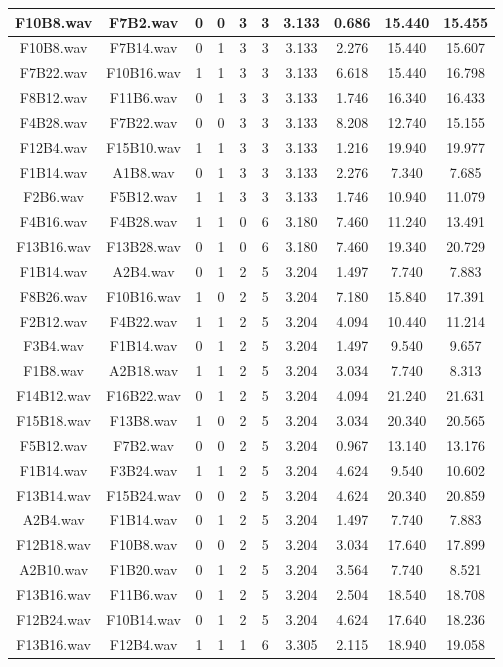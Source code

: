 \documentclass[11pt,a4paper,twoside]{book}
\begin{document}
\begin{longtable}[c]{|c|c|c|c|c|c|c|c|c|c|}
F10B8.wav&F7B2.wav&0&0&3&3&3.133&0.686&15.440&15.455\\ \hline
F10B8.wav&F7B14.wav&0&1&3&3&3.133&2.276&15.440&15.607\\ \hline
F7B22.wav&F10B16.wav&1&1&3&3&3.133&6.618&15.440&16.798\\ \hline
F8B12.wav&F11B6.wav&0&1&3&3&3.133&1.746&16.340&16.433\\ \hline
F4B28.wav&F7B22.wav&0&0&3&3&3.133&8.208&12.740&15.155\\ \hline
F12B4.wav&F15B10.wav&1&1&3&3&3.133&1.216&19.940&19.977\\ \hline
F1B14.wav&A1B8.wav&0&1&3&3&3.133&2.276&7.340&7.685\\ \hline
F2B6.wav&F5B12.wav&1&1&3&3&3.133&1.746&10.940&11.079\\ \hline
F4B16.wav&F4B28.wav&1&1&0&6&3.180&7.460&11.240&13.491\\ \hline
F13B16.wav&F13B28.wav&0&1&0&6&3.180&7.460&19.340&20.729\\ \hline
F1B14.wav&A2B4.wav&0&1&2&5&3.204&1.497&7.740&7.883\\ \hline
F8B26.wav&F10B16.wav&1&0&2&5&3.204&7.180&15.840&17.391\\ \hline
F2B12.wav&F4B22.wav&1&1&2&5&3.204&4.094&10.440&11.214\\ \hline
F3B4.wav&F1B14.wav&0&1&2&5&3.204&1.497&9.540&9.657\\ \hline
F1B8.wav&A2B18.wav&1&1&2&5&3.204&3.034&7.740&8.313\\ \hline
F14B12.wav&F16B22.wav&0&1&2&5&3.204&4.094&21.240&21.631\\ \hline
F15B18.wav&F13B8.wav&1&0&2&5&3.204&3.034&20.340&20.565\\ \hline
F5B12.wav&F7B2.wav&0&0&2&5&3.204&0.967&13.140&13.176\\ \hline
F1B14.wav&F3B24.wav&1&1&2&5&3.204&4.624&9.540&10.602\\ \hline
F13B14.wav&F15B24.wav&0&0&2&5&3.204&4.624&20.340&20.859\\ \hline
A2B4.wav&F1B14.wav&0&1&2&5&3.204&1.497&7.740&7.883\\ \hline
F12B18.wav&F10B8.wav&0&0&2&5&3.204&3.034&17.640&17.899\\ \hline
A2B10.wav&F1B20.wav&0&1&2&5&3.204&3.564&7.740&8.521\\ \hline
F13B16.wav&F11B6.wav&0&1&2&5&3.204&2.504&18.540&18.708\\ \hline
F12B24.wav&F10B14.wav&0&1&2&5&3.204&4.624&17.640&18.236\\ \hline
F13B16.wav&F12B4.wav&1&1&1&6&3.305&2.115&18.940&19.058\\ \hline

\end{longtable}
\end{document}
